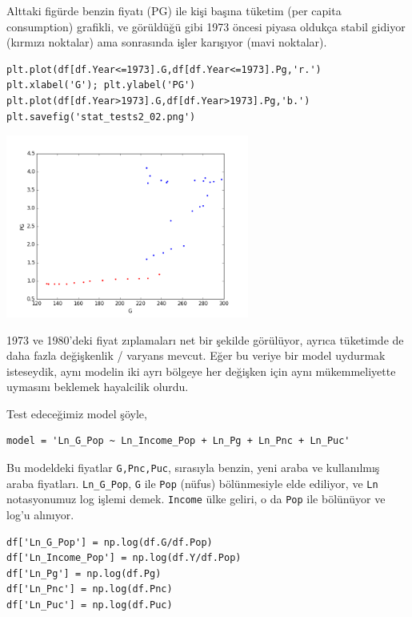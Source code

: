 \documentclass[12pt,fleqn]{article}\usepackage{../../common}
\begin{document}
Alttaki figürde benzin fiyatı (PG) ile kişi başına tüketim (per capita
consumption) grafikli, ve görüldüğü gibi 1973 öncesi piyasa oldukça stabil
gidiyor (kırmızı noktalar) ama sonrasında işler karışıyor (mavi noktalar).

\begin{verbatim}
plt.plot(df[df.Year<=1973].G,df[df.Year<=1973].Pg,'r.')
plt.xlabel('G'); plt.ylabel('PG')
plt.plot(df[df.Year>1973].G,df[df.Year>1973].Pg,'b.')
plt.savefig('stat_tests2_02.png')
\end{verbatim}

\includegraphics[height=6cm]{stat_tests2_02.png}

1973 ve 1980'deki fiyat zıplamaları net bir şekilde görülüyor, ayrıca
tüketimde de daha fazla değişkenlik / varyans mevcut. Eğer bu veriye bir
model uydurmak isteseydik, aynı modelin iki ayrı bölgeye her değişken için
aynı mükemmeliyette uymasını beklemek hayalcilik olurdu.

Test edeceğimiz model şöyle, 

\begin{verbatim}
model = 'Ln_G_Pop ~ Ln_Income_Pop + Ln_Pg + Ln_Pnc + Ln_Puc'
\end{verbatim}

Bu modeldeki fiyatlar \verb!G,Pnc,Puc!, sırasıyla benzin, yeni araba ve
kullanılmış araba fiyatları. \verb!Ln_G_Pop!, \verb!G! ile \verb!Pop!
(nüfus) bölünmesiyle elde ediliyor, ve \verb!Ln! notasyonumuz log işlemi
demek. \verb!Income! ülke geliri, o da \verb!Pop! ile bölünüyor ve log'u
alınıyor.

\begin{verbatim}
df['Ln_G_Pop'] = np.log(df.G/df.Pop)
df['Ln_Income_Pop'] = np.log(df.Y/df.Pop)
df['Ln_Pg'] = np.log(df.Pg)
df['Ln_Pnc'] = np.log(df.Pnc)
df['Ln_Puc'] = np.log(df.Puc)
\end{verbatim}
\end{document}
